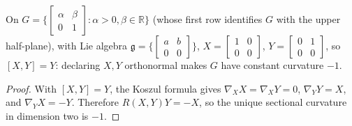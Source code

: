 \begin{example}
  \label{ex:pet-ch4-hyperbolic-lie-group}

  On $G=\Big\{\left[\begin{smallmatrix}\alpha&\beta\\0&1\end{smallmatrix}\right]:\alpha>0,\beta\in\mathbb{R}\Big\}$
  (whose first row identifies $G$ with the upper half-plane), with Lie algebra
  $\mathfrak g=\Big\{\left[\begin{smallmatrix}a&b\\0&0\end{smallmatrix}\right]\Big\}$,
  $X=\left[\begin{smallmatrix}1&0\\0&0\end{smallmatrix}\right]$,
  $Y=\left[\begin{smallmatrix}0&1\\0&0\end{smallmatrix}\right]$, so $[X,Y]=Y$: declaring
  $X,Y$ orthonormal makes $G$ have constant curvature $-1$.
\end{example}
\begin{proof}
  \sketch
  With $[X,Y]=Y$, the Koszul formula gives
  $\nabla_XX=\nabla_XY=0$, $\nabla_YY=X$, and $\nabla_YX=-Y$. Therefore
  $R(X,Y)Y=-X$, so the unique sectional curvature in dimension two is $-1$.
\end{proof}

